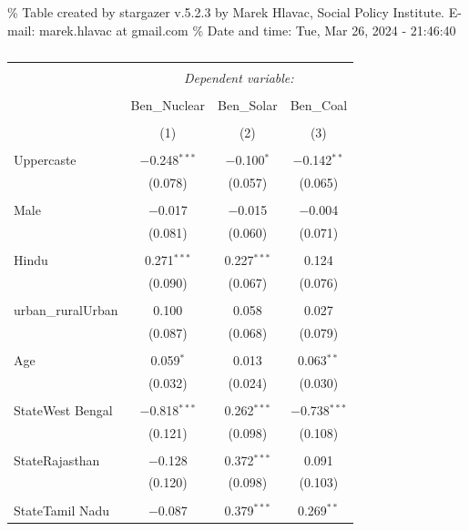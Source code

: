 \documentclass[
]{article}
\begin{document}
\renewcommand{\arraystretch}{0.7}

\% Table created by stargazer v.5.2.3 by Marek Hlavac, Social Policy
Institute. E-mail: marek.hlavac at gmail.com \% Date and time: Tue, Mar
26, 2024 - 21:46:40

\begin{table}[!htbp] \centering 
  \caption{} 
  \label{} 
\begin{tabular}{@{\extracolsep{5pt}}lccc} 
\\[-1.8ex]\hline 
\hline \\[-1.8ex] 
 & \multicolumn{3}{c}{\textit{Dependent variable:}} \\ 
\cline{2-4} 
\\[-1.8ex] & Ben\_Nuclear & Ben\_Solar & Ben\_Coal \\ 
\\[-1.8ex] & (1) & (2) & (3)\\ 
\hline \\[-1.8ex] 
 Uppercaste & $-$0.248$^{***}$ & $-$0.100$^{*}$ & $-$0.142$^{**}$ \\ 
  & (0.078) & (0.057) & (0.065) \\ 
  & & & \\ 
 Male & $-$0.017 & $-$0.015 & $-$0.004 \\ 
  & (0.081) & (0.060) & (0.071) \\ 
  & & & \\ 
 Hindu & 0.271$^{***}$ & 0.227$^{***}$ & 0.124 \\ 
  & (0.090) & (0.067) & (0.076) \\ 
  & & & \\ 
 urban\_ruralUrban & 0.100 & 0.058 & 0.027 \\ 
  & (0.087) & (0.068) & (0.079) \\ 
  & & & \\ 
 Age & 0.059$^{*}$ & 0.013 & 0.063$^{**}$ \\ 
  & (0.032) & (0.024) & (0.030) \\ 
  & & & \\ 
 StateWest Bengal & $-$0.818$^{***}$ & 0.262$^{***}$ & $-$0.738$^{***}$ \\ 
  & (0.121) & (0.098) & (0.108) \\ 
  & & & \\ 
 StateRajasthan & $-$0.128 & 0.372$^{***}$ & 0.091 \\ 
  & (0.120) & (0.098) & (0.103) \\ 
  & & & \\ 
 StateTamil Nadu & $-$0.087 & 0.379$^{***}$ & 0.269$^{**}$ \\ 

\end{tabular}
\end{table}
\end{document}
